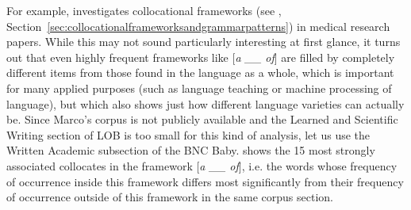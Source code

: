 For example, \citet{marco_collocational_2000} investigates collocational  frameworks  (see , Section~\ref{sec:collocationalframeworksandgrammarpatterns}) in medical research papers. While this may not sound particularly interesting at first glance, it turns out that even highly frequent frameworks like [\textit{a \_\_ of}] are filled by completely different items from those found in the language as a whole, which is important for many applied purposes (such as language teaching or machine processing of language), but which also shows just how different language varieties  can actually be. Since Marco's corpus is not publicly available and the Learned  and Scientific Writing section of LOB  is too small for this kind of analysis, let us use the Written Academic subsection of the BNC Baby.   shows the 15 most strongly associated  collocates  in the framework  [\textit{a \_\_ of}], i.e. the words whose frequency  of occurrence inside this framework differs most significantly from their frequency of occurrence outside of this framework in the same corpus section.

